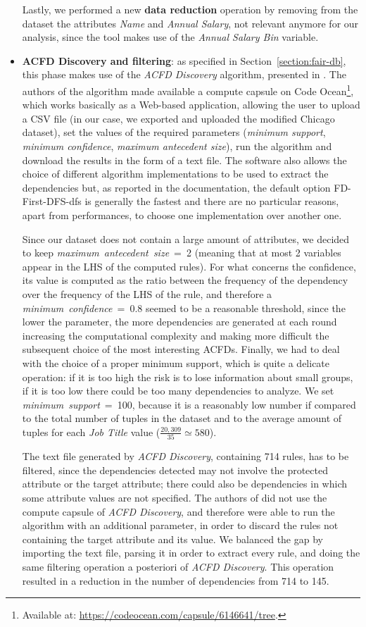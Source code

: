\begin{itemize}
Lastly, we performed a new \textbf{data reduction} operation by removing from the dataset the attributes \textit{Name} and \textit{Annual Salary}, not relevant anymore for our analysis, since the tool makes use of the \textit{Annual Salary Bin} variable.
\item \textbf{ACFD Discovery and filtering}: as specified in Section~\ref{section:fair-db}, this phase makes use of the \textit{ACFD Discovery} algorithm, presented in \cite{rammelaere2018revisiting}. The authors of the algorithm made available a compute capsule on Code Ocean\footnote{Available at: \url{https://codeocean.com/capsule/6146641/tree}.}, which works basically as a Web-based application, allowing the user to upload a CSV file (in our case, we exported and uploaded the modified Chicago dataset), set the values of the required parameters (\textit{minimum support}, \textit{minimum confidence}, \textit{maximum antecedent size}), run the algorithm and download the results in the form of a text file. The software also allows the choice of different algorithm implementations to be used to extract the dependencies but, as reported in the documentation, the default option FD-First-DFS-dfs is generally the fastest and there are no particular reasons, apart from performances, to choose one implementation over another one.

Since our dataset does not contain a large amount of attributes, we decided to keep \textit{maximum~antecedent~size}~=~2 (meaning that at most 2 variables appear in the LHS of the computed rules).
For what concerns the confidence, its value is computed as the ratio between the frequency of the dependency over the frequency of the LHS of the rule, and therefore a \textit{minimum~confidence}~=~0.8 seemed to be a reasonable threshold, since the lower the parameter, the more dependencies are generated at each round increasing the computational complexity and making more difficult the subsequent choice of the most interesting ACFDs.
Finally, we had to deal with the choice of a proper minimum support, which is quite a delicate operation: if it is too high the risk is to lose information about small groups, if it is too low there could be too many dependencies to analyze. We set \textit{minimum~support}~=~100, because it is a reasonably low number if compared to the total number of tuples in the dataset and to the average amount of tuples for each \textit{Job Title} value (\(\frac{20,309}{35} \simeq 580\)).

The text file generated by \textit{ACFD Discovery}, containing 714 rules, has to be filtered, since the dependencies detected may not involve the protected attribute or the target attribute; there could also be dependencies in which some attribute values are not specified. The authors of \cite{azzalini2021fair} did not use the compute capsule of \textit{ACFD Discovery}, and therefore were able to run the algorithm with an additional parameter, in order to discard the rules not containing the target attribute and its value. We balanced the gap by importing the text file, parsing it in order to extract every rule, and doing the same filtering operation a posteriori of \textit{ACFD Discovery}. This operation resulted in a reduction in the number of dependencies from 714 to 145.


\end{itemize}
